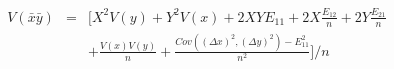 

\[
\begin{array}{lcl} V(\bar{x}\bar{y}) & = & [ X^{2}V(y) + Y^{2}V(x) + 2XYE_{11} + 2X\frac{E_{12}}{n} + 2Y\frac{E_{21}}{n} \\ & & + \frac{V(x)V(y)}{n} + \frac{Cov((\Delta x)^2, (\Delta y)^2) - E_{11}^{2}}{n^2} ] / n \end{array}
\]


